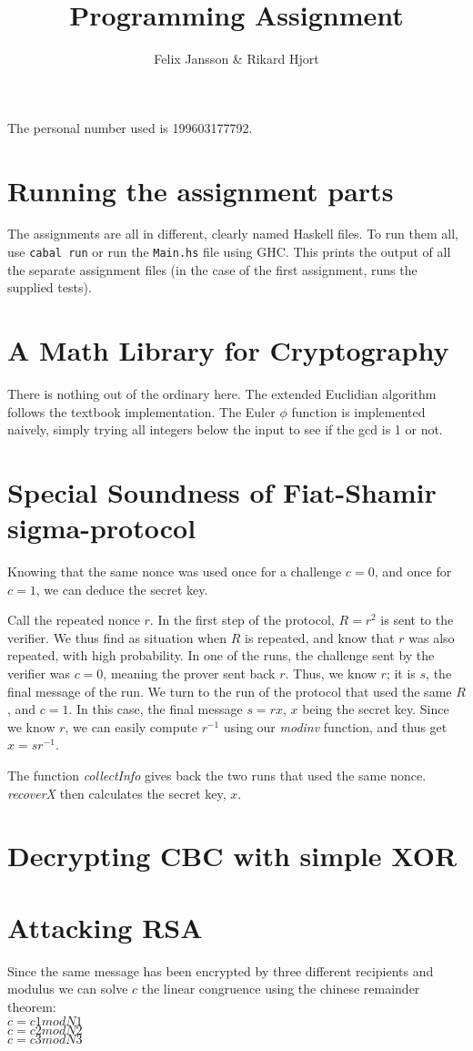 \documentclass{article}
\author{Felix Jansson \& Rikard Hjort}
\title{Programming Assignment}
\begin{document}
The personal number used is 199603177792.

\section{Running the assignment parts}
The assignments are all in different, clearly named Haskell files. To run them
all, use \texttt{cabal run} or run the \texttt{Main.hs} file using GHC. This
prints the output of all the separate assignment files (in the case of the first
assignment, runs the supplied tests).

\section{A Math Library for Cryptography}
There is nothing out of the ordinary here. The extended Euclidian algorithm
follows the textbook implementation. The Euler $\phi$ function is implemented
naively, simply trying all integers below the input to see if the gcd is 1 or not.

\section{Special Soundness of Fiat-Shamir sigma-protocol}
Knowing that the same nonce was used once for a challenge $c=0$, and once for
$c=1$, we can deduce the secret key.

Call the repeated nonce $r$. In the first step of the protocol, $R=r^2$ is sent
to the verifier. We thus find as situation when $R$ is repeated, and know that
$r$ was also repeated, with high probability. In one of the runs, the
challenge sent by the verifier was $c=0$, meaning the prover sent back $r$.
Thus, we know $r$; it is $s$, the final message of the run. We turn to the run
of the protocol that used the same $R$, and $c=1$. In this case, the final
message $s=rx$, $x$ being the secret key. Since we know $r$, we can easily
compute $r^{-1}$ using our \textit{modinv} function, and thus get $x=sr^{-1}$.

The function \textit{collectInfo} gives back the two runs that used the same
nonce. \textit{recoverX} then calculates the
secret key, $x$.

\section{Decrypting CBC with simple XOR}


\section{Attacking RSA}
Since the same message has been encrypted by three different recipients and modulus we can solve $c$ the linear congruence using the chinese remainder theorem:\\
$c = c1 mod N1$\\
$c = c2 mod N2$\\
$c = c3 mod N3$\\
\end{document}
